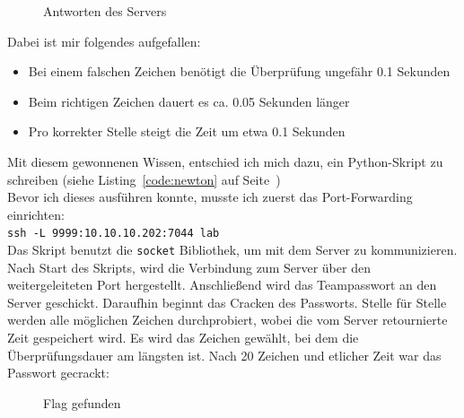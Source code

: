 \documentclass[12pt, a4paper, titlepage, oneside]{scrartcl}
\begin{document}
	\begin{figure}[h!]
		\centering
		\caption{Antworten des Servers}
		\label{fig:newton1}
	\end{figure}

	Dabei ist mir folgendes aufgefallen:
	\begin{itemize}
		\item Bei einem falschen Zeichen benötigt die Überprüfung ungefähr 0.1 Sekunden
		\item Beim richtigen Zeichen dauert es ca. 0.05 Sekunden länger
		\item Pro korrekter Stelle steigt die Zeit um etwa 0.1 Sekunden
	\end{itemize}
	Mit diesem gewonnenen Wissen, entschied ich mich dazu, ein Python-Skript zu schreiben (siehe Listing~\ref*{code:newton} auf Seite~\pageref*{code:newton}) \\
	Bevor ich dieses ausführen konnte, musste ich zuerst das Port-Forwarding einrichten: \\
	\lstinline{ssh -L 9999:10.10.10.202:7044 lab} \\
	Das Skript benutzt die \lstinline{socket} Bibliothek, um mit dem Server zu kommunizieren. Nach Start des Skripts, wird die Verbindung zum Server über den weitergeleiteten Port hergestellt.
	Anschließend wird das Teampasswort an den Server geschickt. Daraufhin beginnt das Cracken des Passworts. Stelle für Stelle werden alle möglichen Zeichen durchprobiert, wobei die vom Server retournierte Zeit gespeichert wird.
	Es wird das Zeichen gewählt, bei dem die Überprüfungsdauer am längsten ist.
	Nach 20 Zeichen und etlicher Zeit war das Passwort gecrackt:

	\begin{figure}[h!]
		\centering
		\caption{Flag gefunden}
		\label{fig:newton2}
	\end{figure}
\end{document}
